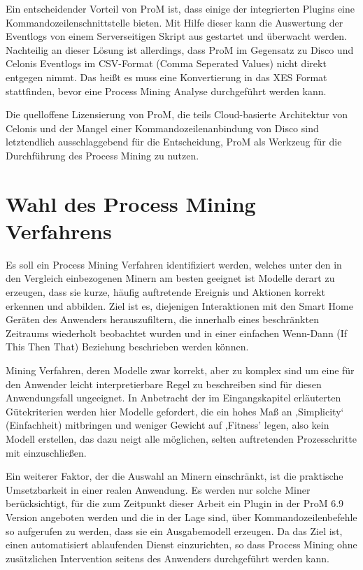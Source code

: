 Ein entscheidender Vorteil von ProM ist, dass einige der integrierten Plugins eine Kommandozeilenschnittstelle bieten. Mit Hilfe dieser kann die Auswertung der Eventlogs von einem Serverseitigen Skript aus gestartet und überwacht werden. Nachteilig an dieser Lösung ist allerdings, dass ProM im Gegensatz zu Disco und Celonis Eventlogs im CSV-Format (Comma Seperated Values) nicht direkt entgegen nimmt. Das heißt es muss eine Konvertierung in das XES Format stattfinden, bevor eine Process Mining Analyse durchgeführt werden kann.

Die quelloffene Lizensierung von ProM, die teils Cloud-basierte Architektur von Celonis und der Mangel einer Kommandozeilenanbindung von Disco sind letztendlich ausschlaggebend für die Entscheidung, ProM als Werkzeug für die Durchführung des Process Mining zu nutzen. 

\section{Wahl des Process Mining Verfahrens}

Es soll ein Process Mining Verfahren identifiziert werden, welches unter den in den Vergleich einbezogenen Minern am besten geeignet ist Modelle derart zu erzeugen, dass sie kurze, häufig auftretende Ereignis und Aktionen korrekt erkennen und abbilden. Ziel ist es, diejenigen Interaktionen mit den Smart Home Geräten des Anwenders herauszufiltern, die innerhalb eines beschränkten Zeitraums wiederholt beobachtet wurden und in einer einfachen Wenn-Dann (If This Then That) Beziehung beschrieben werden können. 

Mining Verfahren, deren Modelle zwar korrekt, aber zu komplex sind um eine für den Anwender leicht interpretierbare Regel zu beschreiben sind für diesen Anwendungsfall ungeeignet. In Anbetracht der im Eingangskapitel erläuterten Gütekriterien werden hier Modelle gefordert, die ein hohes Maß an ‚Simplicity‘ (Einfachheit) mitbringen und weniger Gewicht auf ,Fitness' legen, also kein Modell erstellen, das dazu neigt alle möglichen, selten auftretenden Prozesschritte mit einzuschließen. 

Ein weiterer Faktor, der die Auswahl an Minern einschränkt, ist die praktische Umsetzbarkeit in einer realen Anwendung. Es werden nur solche Miner berücksichtigt, für die zum Zeitpunkt dieser Arbeit ein Plugin in der ProM 6.9 Version angeboten werden und die in der Lage sind, über Kommandozeilenbefehle so aufgerufen zu werden, dass sie ein Ausgabemodell erzeugen. Da das Ziel ist, einen automatisiert ablaufenden Dienst einzurichten, so dass Process Mining ohne zusätzlichen Intervention seitens des Anwenders durchgeführt werden kann.

